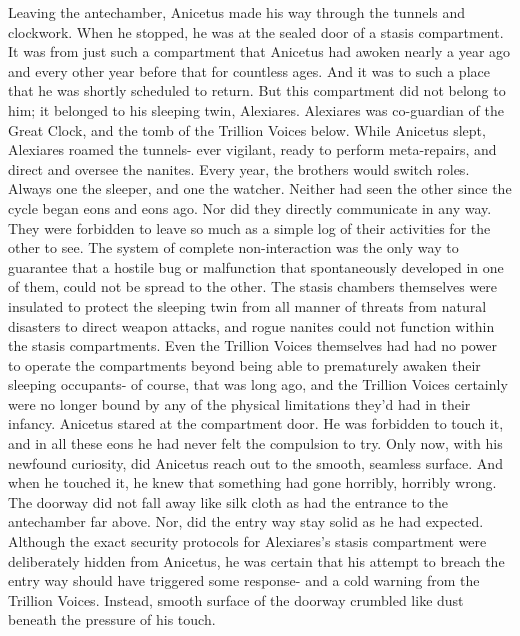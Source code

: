 \documentclass[a4paper]{article}
\begin{document}
Leaving the antechamber, Anicetus made his way through the tunnels and clockwork. When he stopped, he was at the sealed door of a stasis compartment. It was from just such a compartment that Anicetus had awoken nearly a year ago and every other year before that for countless ages. And it was to such a place that he was shortly scheduled to return. But this compartment did not belong to him; it belonged to his sleeping twin, Alexiares.
Alexiares was co-guardian of the Great Clock, and the tomb of the Trillion Voices below. While Anicetus slept, Alexiares roamed the tunnels- ever vigilant, ready to perform meta-repairs, and direct and oversee the nanites.
Every year, the brothers would switch roles. Always one the sleeper, and one the watcher. Neither had seen the other since the cycle began eons and eons ago. Nor did they directly communicate in any way. They were forbidden to leave so much as a simple log of their activities for the other to see.
The system of complete non-interaction was the only way to guarantee that a hostile bug or malfunction that spontaneously developed in one of them, could not be spread to the other. The stasis chambers themselves were insulated to protect the sleeping twin from all manner of threats from natural disasters to direct weapon attacks, and rogue nanites could not function within the stasis compartments. Even the Trillion Voices themselves had had no power to operate the compartments beyond being able to prematurely awaken their sleeping occupants- of course, that was long ago, and the Trillion Voices certainly were no longer bound by any of the physical limitations they'd had in their infancy.
Anicetus stared at the compartment door. He was forbidden to touch it, and in all these eons he had never felt the compulsion to try. Only now, with his newfound curiosity, did Anicetus reach out to the smooth, seamless surface. And when he touched it, he knew that something had gone horribly, horribly wrong.
The doorway did not fall away like silk cloth as had the entrance to the antechamber far above. Nor, did the entry way stay solid as he had expected. Although the exact security protocols for Alexiares’s stasis compartment were deliberately hidden from Anicetus, he was certain that his attempt to breach the entry way should have triggered some response- and a cold warning from the Trillion Voices. Instead, smooth surface of the doorway crumbled like dust beneath the pressure of his touch.
\end{document}
